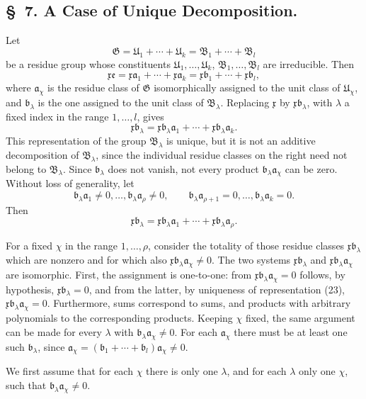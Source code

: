 \documentclass[11pt]{article}
\newcommand{\mG}{\mathfrak{G}}
\newcommand{\mB}{\mathfrak{B}}
\newcommand{\ma}{\mathfrak{a}}
\newcommand{\mb}{\mathfrak{b}}
\newcommand{\mx}{\mathfrak{x}}
\newcommand{\me}{\mathfrak{e}}
\newcommand{\mU}{\mathfrak{U}}
\begin{document}
\subsection*{\S~7. A Case of Unique Decomposition.}

Let
\[
 \mG=\mU_1+\cdots+\mU_k=\mB_1+\cdots+\mB_l
\]
be a residue group whose constituents $\mU_1,
\ldots,\mU_k$, $\mB_1,
\ldots,\mB_l$ are irreducible. Then
\begin{equation}
 \mx\me=\mx\ma_1+\cdots+\mx\ma_k
 =\mx\mb_1+\cdots+\mx\mb_l,
\tag{22}
\end{equation}
where $\ma_\chi$ is the residue class of $\mG$ isomorphically assigned to the unit class of $\mU_\chi$, and $\mb_\lambda$ is the one assigned to the unit class of $\mB_\lambda$. Replacing $\mx$ by $\mx\mb_\lambda$, with $\lambda$ a fixed index in the range $1,
\ldots,l$, gives
\begin{equation}
 \mx\mb_\lambda=\mx\mb_\lambda\ma_1+\cdots+\mx\mb_\lambda\ma_k.
\tag{23}
\end{equation}
This representation of the group $\mB_\lambda$ is unique, but it is not an additive decomposition of $\mB_\lambda$, since the individual residue classes on the right need not belong to $\mB_\lambda$. Since $\mb_\lambda$ does not vanish, not every product $\mb_\lambda\ma_\chi$ can be zero. Without loss of generality, let
\[
 \mb_\lambda\ma_1\ne0,
 \ldots,
 \mb_\lambda\ma_\rho\ne0,
 \qquad
 \mb_\lambda\ma_{\rho+1}=0,
 \ldots,
 \mb_\lambda\ma_k=0.
\]
Then
\[
 \mx\mb_\lambda=\mx\mb_\lambda\ma_1+\cdots+\mx\mb_\lambda\ma_\rho.
\]

For a fixed $\chi$ in the range $1,
\ldots,\rho$, consider the totality of those residue classes $\mx\mb_\lambda$ which are nonzero and for which also $\mx\mb_\lambda\ma_\chi\ne0$. The two systems $\mx\mb_\lambda$ and $\mx\mb_\lambda\ma_\chi$ are isomorphic. First, the assignment is one-to-one: from $\mx\mb_\lambda\ma_\chi=0$ follows, by hypothesis, $\mx\mb_\lambda=0$, and from the latter, by uniqueness of representation (23), $\mx\mb_\lambda\ma_\chi=0$. Furthermore, sums correspond to sums, and products with arbitrary polynomials to the corresponding products. Keeping $\chi$ fixed, the same argument can be made for every $\lambda$ with $\mb_\lambda\ma_\chi\ne0$. For each $\ma_\chi$ there must be at least one such $\mb_\lambda$, since $\ma_\chi=(\mb_1+
\cdots+\mb_l)\ma_\chi\ne0$.

We first assume that for each $\chi$ there is only one $\lambda$, and for each $\lambda$ only one $\chi$, such that $\mb_\lambda\ma_\chi\ne0$.
\end{document}
